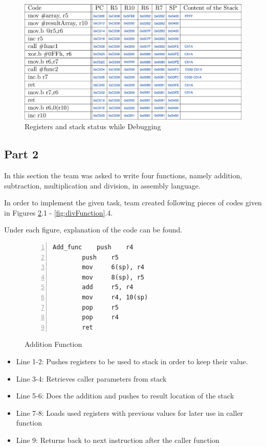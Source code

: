 \documentclass[pdftex,12pt,a4paper]{article}
\begin{document}
\begin{figure}[H]
    \centering
    \includegraphics[width=1\textwidth]{table.png}
    \caption{Registers and stack status while Debugging}
    \label{fig:part1}
\end{figure}


\subsection{Part 2}
\newline
In this section the team was asked to write four functions, namely addition, subtraction, multiplication and division, in assembly language.

In order to implement the given task, team created following pieces of codes given in Figures \ref{fig:addFunction}.1 - \ref{fig:divFunction}.4.

Under each figure, explanation of the code can be found.

\begin{figure}[H]
    \centering
\begin{lstlisting}[language={[x86masm]Assembler}, numbers=left]
Add_func	push	r4
		push	r5
		mov		6(sp), r4
		mov		8(sp), r5
		add		r5, r4
		mov		r4, 10(sp)
		pop		r5
		pop		r4
		ret
    \end{lstlisting}
    \label{fig:addFunction}
    \caption{Addition Function}
\end{figure}

\begin{itemize}
    \item Line 1-2: Pushes registers to be used to stack in order to keep their value.
    \item Line 3-4: Retrieves caller parameters from stack
    \item Line 5-6: Does the addition and pushes to result location of the stack
    \item Line 7-8: Loads used registers with previous values for later use in caller function
    \item Line 9: Returns back to next instruction after the caller function

\end{itemize}
\end{document}
